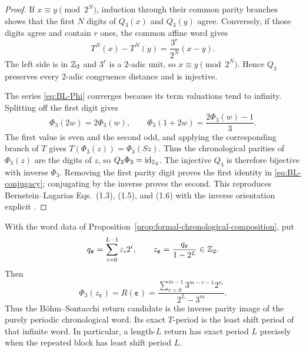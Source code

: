 \begin{proof}
If $x\equiv y\pmod{2^N}$, induction through their common parity branches
shows that the first $N$ digits of $Q_3(x)$ and $Q_3(y)$ agree.  Conversely,
if those digits agree and contain $r$ ones, the common affine word gives
\[
 T^N(x)-T^N(y)=\frac{3^r}{2^N}(x-y).
\]
The left side is in $\mathbb{Z}_{2}$ and $3^r$ is a $2$-adic unit, so
$x\equiv y\pmod{2^N}$.  Hence $Q_3$ preserves every $2$-adic congruence
distance and is injective.

The series \eqref{eq:BL-Phi} converges because its term valuations tend to
infinity.  Splitting off the first digit gives
\[
 \Phi_3(2w)=2\Phi_3(w),
 \qquad
 \Phi_3(1+2w)=\frac{2\Phi_3(w)-1}{3}.
\]
The first value is even and the second odd, and applying the corresponding
branch of $T$ gives $T(\Phi_3(z))=\Phi_3(Sz)$.  Thus the chronological
parities of $\Phi_3(z)$ are the digits of $z$, so
$Q_3\Phi_3=\operatorname{id}_{\mathbb{Z}_{2}}$.  The injective $Q_3$ is therefore
bijective with inverse $\Phi_3$.  Removing the first parity digit proves the
first identity in \eqref{eq:BL-conjugacy}; conjugating by the inverse proves
the second.  This reproduces Bernstein--Lagarias Eqs.~(1.3), (1.5), and
(1.6) with the inverse orientation explicit
\cite[author-copy pp.~1--2]{BernsteinLagarias1996}.
\end{proof}

\begin{corollary}
\label{cor:periodic-word-resummation}
With the word data of
Proposition~\ref{prop:formal-chronological-composition}, put
\[
 q_{\boldsymbol\varepsilon}=\sum_{i=0}^{L-1}\varepsilon_i2^i,
 \qquad
 z_{\boldsymbol\varepsilon}
 =\frac{q_{\boldsymbol\varepsilon}}{1-2^L}\in\mathbb{Z}_{2}.
\]
Then
\begin{equation}
\label{eq:periodic-word-resummation}
 \Phi_3(z_{\boldsymbol\varepsilon})
 =R(\boldsymbol\varepsilon)
 =\frac{\displaystyle\sum_{r=0}^{m-1}3^{m-r-1}2^{v_r}}
        {2^L-3^m}.
\end{equation}
Thus the B\"ohm--Sontacchi return candidate is the inverse parity image of
the purely periodic chronological word.  Its exact $T$-period is the least
shift period of that infinite word.  In particular, a length-$L$ return has
exact period $L$ precisely when the repeated block has least shift period
$L$.
\end{corollary}


